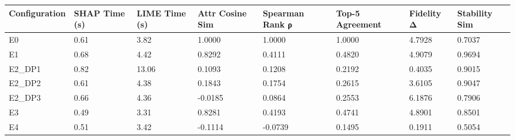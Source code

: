 \begin{tabular}{llllllll}
\toprule
Configuration & SHAP Time (s) & LIME Time (s) & Attr Cosine Sim & Spearman Rank ρ & Top-5 Agreement & Fidelity Δ & Stability Sim \\
\midrule
E0 & 0.61 & 3.82 & 1.0000 & 1.0000 & 1.0000 & 4.7928 & 0.7037 \\
E1 & 0.68 & 4.42 & 0.8292 & 0.4111 & 0.4820 & 4.9079 & 0.9694 \\
E2_DP1 & 0.82 & 13.06 & 0.1093 & 0.1208 & 0.2192 & 0.4035 & 0.9015 \\
E2_DP2 & 0.61 & 4.38 & 0.1843 & 0.1754 & 0.2615 & 3.6105 & 0.9047 \\
E2_DP3 & 0.66 & 4.36 & -0.0185 & 0.0864 & 0.2553 & 6.1876 & 0.7906 \\
E3 & 0.49 & 3.31 & 0.8281 & 0.4193 & 0.4741 & 4.8901 & 0.8501 \\
E4 & 0.51 & 3.42 & -0.1114 & -0.0739 & 0.1495 & 0.1911 & 0.5054 \\
\bottomrule
\end{tabular}
